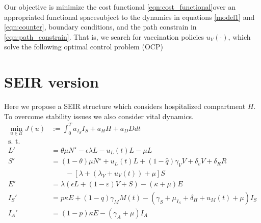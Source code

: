 \documentclass[a4paper,10pt]{amsart}
\begin{document}
    Our objective is minimize the cost functional
  \eqref{eqn:cost_functional}\textemdash over an appropriated functional
  space\textemdash subject to the dynamics in equations \eqref{model1} and \eqref{eqn:counter},
  boundary conditions, and the path constrain in \eqref{eqn:path_constrain}.
  That is, we search for vaccination policies $u_V(\cdot)$, which
  solve the following optimal control problem (OCP)

    \section{SEIR version}
       Here we propose a SEIR structure which considers hospitalized
    compartment $ H $. To overcome stability issues we also consider
    vital dynamics.
    \begin{equation}
        \label{eqn:vital_dynamics}
        \begin{aligned}
            \min_{u \in \mathcal{U}} J(u) & :=
            \int_{0}^T
                    a_{I_S} I_S
                    + a_{H} H
                    + a_{D} D
                dt
            \\
            \text{s. t.} &
            \\
            L' & =  \theta \mu N^{\star}
                -\epsilon \lambda L - u_L(t) L - \mu L
            \\
            S' & = 
                (1 - \theta) \mu N^\star 
                + u_L(t) L 
                + (1 - \widehat{q}) \gamma_V V 
                + \delta_v V 
                + \delta_R R
            \\
                & \qquad - 
                \left[
                	\lambda + (\lambda_V + u_V(t)) + \mu
                \right] S 
            \\
            E' &= 
                \lambda (\epsilon L + (1-\varepsilon) V + S) 
                - (\kappa + \mu) E
            \\
            I_S' &= 
                p \kappa E 
                + (1 - q) \gamma_M M(t)
                - (\gamma_S + \mu_{I_S} + \delta_H + u_M(t) + \mu) I_S
            \\
            I_A' &= 
                (1 - p) \kappa E - (\gamma_A + \mu) I_A

\end{aligned}
\end{equation}
\end{document}
